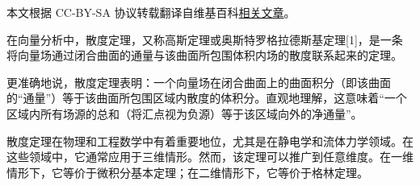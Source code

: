 
本文根据 CC-BY-SA 协议转载翻译自维基百科\href{https://en.wikipedia.org/wiki/Divergence_theorem}{相关文章}。

在向量分析中，散度定理，又称高斯定理或奥斯特罗格拉德斯基定理[1]，是一条将向量场通过闭合曲面的通量与该曲面所包围体积内场的散度联系起来的定理。

更准确地说，散度定理表明：一个向量场在闭合曲面上的曲面积分（即该曲面的“通量”）等于该曲面所包围区域内散度的体积分。直观地理解，这意味着“一个区域内所有场源的总和（将汇点视为负源）等于该区域向外的净通量”。

散度定理在物理和工程数学中有着重要地位，尤其是在静电学和流体力学领域。在这些领域中，它通常应用于三维情形。然而，该定理可以推广到任意维度。在一维情形下，它等价于微积分基本定理；在二维情形下，它等价于格林定理。
